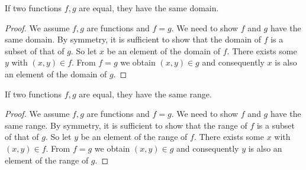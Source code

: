 \begin{prop}\label{Cat:prop:functions:equal:domain}
    If two functions $f,g$ are equal, they have the same domain.
\end{prop}
\begin{proof}
    We assume $f,g$ are functions and $f=g$. We need to show $f$ and
    $g$ have the same domain. By symmetry, it is sufficient to show
    that the domain of $f$ is a subset of that of $g$. So let $x$
    be an element of the domain of $f$. There exists some $y$ with
    $(x,y)\in f$. From $f=g$ we obtain $(x,y)\in g$ and consequently
    $x$ is also an element of the domain of $g$.
\end{proof}


\begin{prop}\label{Cat:prop:functions:equal:range}
    If two functions $f,g$ are equal, they have the same range.
\end{prop}
\begin{proof}
    We assume $f,g$ are functions and $f=g$. We need to show $f$ and
    $g$ have the same range. By symmetry, it is sufficient to show
    that the range of $f$ is a subset of that of $g$. So let $y$
    be an element of the range of $f$. There exists some $x$ with
    $(x,y)\in f$. From $f=g$ we obtain $(x,y)\in g$ and consequently
    $y$ is also an element of the range of $g$.
\end{proof}

